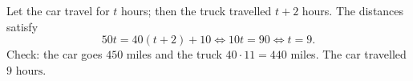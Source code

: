 Let the car travel for $t$ hours; then the truck travelled $t+2$ hours. The distances satisfy
\[
50t=40(t+2)+10\iff 10t=90\iff t=9 .
\]
Check: the car goes $450$ miles and the truck $40\cdot11=440$ miles. The car travelled $\boxed{9\text{ hours}}$.
